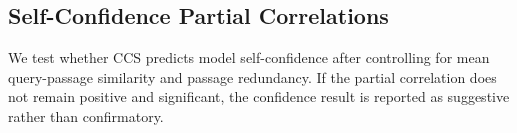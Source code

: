
\subsection{Self-Confidence Partial Correlations}
\label{sec:fix09_partial_confidence}

We test whether CCS predicts model self-confidence after controlling for
mean query-passage similarity and passage redundancy. If the partial
correlation does not remain positive and significant, the confidence result
is reported as suggestive rather than confirmatory.

